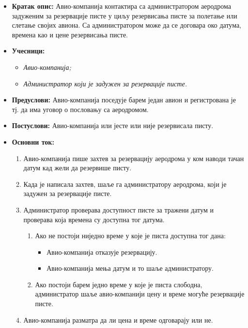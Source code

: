 \documentclass{article}
\begin{document}
\begin{itemize}
    \item \textbf{Кратак опис:} Авио-компанија контактира са администратором аеродрома задуженим за резервације писте у циљу резервисања писте за полетање или слетање својих авиона. Са администратором може да се договара око датума, времена као и цене резервисања писте.
    \item \textbf{Учесници:}
        \begin{itemize}
            \item \textit{Авио-компанија;}
            \item \textit{Администратор који је задужен за резервације писте.}
        \end{itemize}
    \item \textbf{Предуслови:} Авио-компанија поседује барем један авион и регистрована је тј. да има уговор о пословању са аеродромом.
    \item \textbf{Постуслови:} Авио-компанија или јесте или није резервисала писту.
    \item \textbf{Основни ток:}
        \begin{enumerate}
            \item Авио-компанија пише захтев за резервацију аеродрома у ком наводи тачан датум кад жели да резервише писту.
            \item Када је написала захтев, шаље га администратору аеродрома, који је задужен за резервације писте.
            \newpage
            \item Администратор проверава доступност писте за тражени датум и проверава која времена су доступна тог датума. 
                \begin{enumerate}
                    \item Ако не постоји ниједно време у које је писта доступна тог дана:
                        \begin{itemize}
                            \item Авио-компанија отказује резервацију.
                            \item Авио-компанија мења датум и то шаље администратору.
                        \end{itemize}
                    \item Ако постоји барем једно време у које је писта слободна, администратор шаље авио-компанији цену и време могуће резервације писте.
                \end{enumerate}
            \item Авио-компанија разматра да ли цена и време одговарају или не.

\end{enumerate}
\end{itemize}
\end{document}
